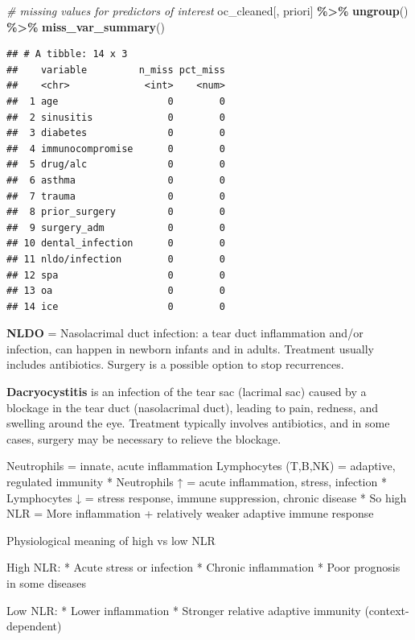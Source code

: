 \documentclass[
]{article}
\newenvironment{Shaded}{\begin{snugshade}}{\end{snugshade}}
\newcommand{\CommentTok}[1]{\textcolor[rgb]{0.56,0.35,0.01}{\textit{#1}}}
\newcommand{\FunctionTok}[1]{\textcolor[rgb]{0.13,0.29,0.53}{\textbf{#1}}}
\newcommand{\NormalTok}[1]{#1}
\newcommand{\SpecialCharTok}[1]{\textcolor[rgb]{0.81,0.36,0.00}{\textbf{#1}}}
\begin{document}
\begin{Shaded}
\begin{Highlighting}[]
\CommentTok{\# missing values for predictors of interest}
\NormalTok{oc\_cleaned[, priori] }\SpecialCharTok{\%\textgreater{}\%} \FunctionTok{ungroup}\NormalTok{() }\SpecialCharTok{\%\textgreater{}\%} \FunctionTok{miss\_var\_summary}\NormalTok{()}
\end{Highlighting}
\end{Shaded}

\begin{verbatim}
## # A tibble: 14 x 3
##    variable         n_miss pct_miss
##    <chr>             <int>    <num>
##  1 age                   0        0
##  2 sinusitis             0        0
##  3 diabetes              0        0
##  4 immunocompromise      0        0
##  5 drug/alc              0        0
##  6 asthma                0        0
##  7 trauma                0        0
##  8 prior_surgery         0        0
##  9 surgery_adm           0        0
## 10 dental_infection      0        0
## 11 nldo/infection        0        0
## 12 spa                   0        0
## 13 oa                    0        0
## 14 ice                   0        0
\end{verbatim}

\textbf{NLDO} = Nasolacrimal duct infection:
a tear duct inflammation and/or infection, can happen in newborn infants and in
adults. Treatment usually includes antibiotics. Surgery is a possible option to
stop recurrences.

\textbf{Dacryocystitis} is an infection of the tear sac (lacrimal sac) caused by a
blockage in the tear duct (nasolacrimal duct), leading to pain, redness, and
swelling around the eye. Treatment typically involves antibiotics, and in some
cases, surgery may be necessary to relieve the blockage.

Neutrophils = innate, acute inflammation
Lymphocytes (T,B,NK) = adaptive, regulated immunity
* Neutrophils ↑ = acute inflammation, stress, infection
* Lymphocytes ↓ = stress response, immune suppression, chronic disease
* So high NLR = More inflammation + relatively weaker adaptive immune response

Physiological meaning of high vs low NLR

High NLR:
* Acute stress or infection
* Chronic inflammation
* Poor prognosis in some diseases

Low NLR:
* Lower inflammation
* Stronger relative adaptive immunity (context-dependent)
\end{document}
